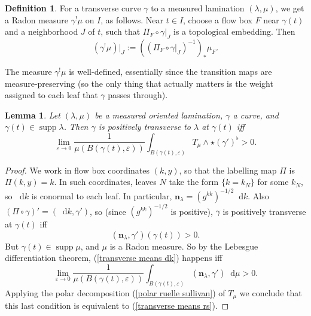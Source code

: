 \documentclass[reqno,11pt]{amsart}
\newcommand*\dif{\mathop{}\!\mathrm{d}}
\DeclareMathOperator{\supp}{supp}
\newcommand{\normal}{\mathbf n}
\newtheorem{lemma}[theorem]{Lemma}
\theoremstyle{definition}
\newtheorem{definition}[theorem]{Definition}
\numberwithin{equation}{section}
\begin{document}
\begin{definition}
For a transverse curve $\gamma$ to a measured lamination $(\lambda, \mu)$, we get a Radon measure $\gamma^! \mu$ on $I$, as follows.
Near $t \in I$, choose a flow box $F$ near $\gamma(t)$ and a neighborhood $J$ of $t$, such that $\Pi_F \circ \gamma|_J$ is a topological embedding.
Then
$$(\gamma^! \mu)|_J := ((\Pi_F \circ \gamma|_J)^{-1})_* \mu_F.$$
\end{definition}

The measure $\gamma^! \mu$ is well-defined, essentially since the transition maps are measure-preserving (so the only thing that actually matters is the weight assigned to each leaf that $\gamma$ passes through).

\begin{lemma}
Let $(\lambda, \mu)$ be a measured oriented lamination, $\gamma$ a curve, and $\gamma(t) \in \supp \lambda$.
Then $\gamma$ is positively transverse to $\lambda$ at $\gamma(t)$ iff
\begin{equation}\label{transverse means rs}
\lim_{\varepsilon \to 0} \frac{1}{\mu(B(\gamma(t), \varepsilon))} \int_{B(\gamma(t), \varepsilon)} T_\mu \wedge \star (\gamma')^\flat > 0.
\end{equation}
\end{lemma}
\begin{proof}
We work in flow box coordinates $(k, y)$, so that the labelling map $\Pi$ is $\Pi(k, y) = k$.
In such coordinates, leaves $N$ take the form $\{k = k_N\}$ for some $k_N$, so $\dif k$ is conormal to each leaf.
In particular, $\normal_\lambda = (g^{kk})^{-1/2} \dif k$.
Also $(\Pi \circ \gamma)' = (\dif k, \gamma')$, so (since $(g^{kk})^{-1/2}$ is positive), $\gamma$ is positively transverse at $\gamma(t)$ iff
\begin{equation}\label{transverse means dk}
(\normal_\lambda, \gamma')(\gamma(t)) > 0.
\end{equation}
But $\gamma(t) \in \supp \mu$, and $\mu$ is a Radon measure.
So by the Lebesgue differentiation theorem, (\ref{transverse means dk}) happens iff
$$\lim_{\varepsilon \to 0} \frac{1}{\mu(B(\gamma(t), \varepsilon))} \int_{B(\gamma(t), \varepsilon)} (\normal_\lambda, \gamma') \dif \mu > 0.$$
Applying the polar decomposition (\ref{polar ruelle sullivan}) of $T_\mu$ we conclude that this last condition is equivalent to (\ref{transverse means rs}).
\end{proof}
\end{document}
